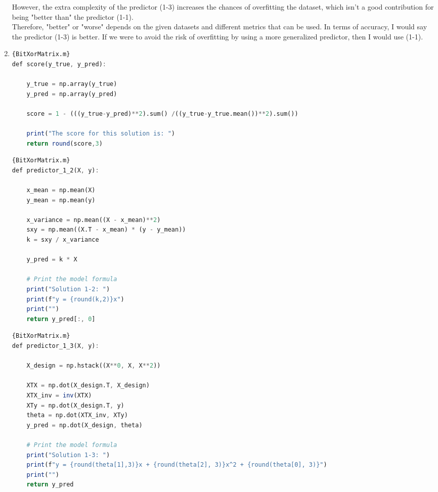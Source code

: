 \documentclass{assignment}
\begin{document}
\begin{problem}
\begin{enumerate}[label=\alph*)]
    However, the extra complexity of the predictor (1-3) increases the chances of overfitting the dataset, which isn't a good contribution for being "better than" the predictor (1-1).\\

    Therefore, "better" or "worse" depends on the given datasets and different metrics that can be used. In terms of accuracy, I would say the predictor (1-3) is better. If we were to avoid the risk of overfitting by using a more generalized predictor, then I would use (1-1). \\

    \item
\begin{lstlisting}[language=Octave]{BitXorMatrix.m}
def score(y_true, y_pred):

    y_true = np.array(y_true)
    y_pred = np.array(y_pred)
    
    score = 1 - (((y_true-y_pred)**2).sum() /((y_true-y_true.mean())**2).sum())
    
    print("The score for this solution is: ")
    return round(score,3)
\end{lstlisting}

\begin{lstlisting}[language=Octave]{BitXorMatrix.m}
def predictor_1_2(X, y):

    x_mean = np.mean(X)
    y_mean = np.mean(y)
    
    x_variance = np.mean((X - x_mean)**2)
    sxy = np.mean((X.T - x_mean) * (y - y_mean))
    k = sxy / x_variance
    
    y_pred = k * X  
    
    # Print the model formula
    print("Solution 1-2: ")
    print(f"y = {round(k,2)}x")
    print("")
    return y_pred[:, 0]
\end{lstlisting}

\begin{lstlisting}[language=Octave]{BitXorMatrix.m}
def predictor_1_3(X, y):

    X_design = np.hstack((X**0, X, X**2))
    
    XTX = np.dot(X_design.T, X_design)
    XTX_inv = inv(XTX)
    XTy = np.dot(X_design.T, y)
    theta = np.dot(XTX_inv, XTy)
    y_pred = np.dot(X_design, theta)
    
    # Print the model formula
    print("Solution 1-3: ")
    print(f"y = {round(theta[1],3)}x + {round(theta[2], 3)}x^2 + {round(theta[0], 3)}")
    print("")
    return y_pred
\end{lstlisting}


\end{enumerate}
\end{problem}
\end{document}
